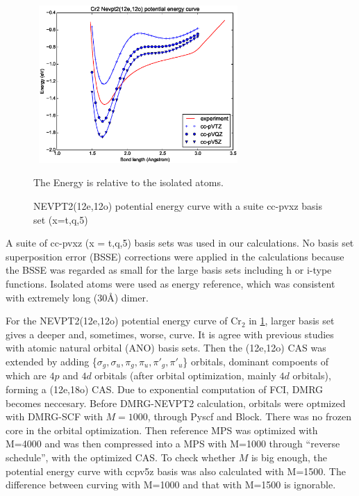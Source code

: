 \begin{figure}\label{fig:12o_nevpt2}
  \includegraphics[width=8cm,height=6cm]{application/12o-nevpt2.eps}
  \caption{NEVPT2(12e,12o) potential energy curve with a suite cc-pvxz basis set (x=t,q,5)}
  {\footnotesize The Energy is relative to the isolated atoms. }
\end{figure}

A suite of cc-pvxz (x = t,q,5) basis sets was used in our calculations. No basis set superposition error (BSSE) corrections were applied in the calculations because the BSSE was regarded as small for the large basis sets including h or i-type functions. Isolated atoms were used as energy reference, which was consistent with extremely long ($30\mbox{\AA}$) dimer.

For the NEVPT2(12e,12o) potential energy curve of Cr$_2$ in \ref{fig:12o_nevpt2}, larger basis set gives a deeper and, sometimes, worse, curve. It is agree with previous studies with atomic natural orbital (ANO) basis sets.
Then the (12e,12o) CAS was extended by adding \{$\sigma_g,\sigma_u,\pi_g,\pi_u,\pi'_g,\pi'_u$\} orbitals, dominant compoents of which are $4p$ and $4d$ orbitals (after orbital optimization, mainly $4d$ orbitals), forming a (12e,18o) CAS. Due to exponential computation of FCI, DMRG becomes neccesary.
Before DMRG-NEVPT2 calculation, orbitals were optmized with DMRG-SCF with $M=1000$, through Pyscf and Block. There was no frozen core in the orbital optimization. Then reference MPS was optimized with M=4000 and was then compressed into a MPS with M=1000 through ``reverse schedule'', with the optimized CAS. To check whether $M$ is big enough, the potential energy curve with ccpv5z basis was also calculated with M=1500. The difference between curving with M=1000 and that with M=1500 is ignorable.


